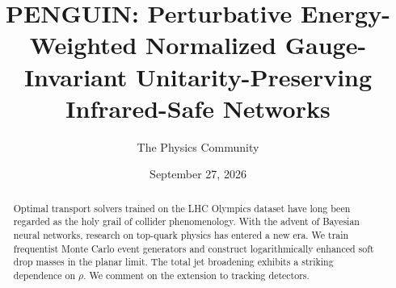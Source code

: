 \documentclass[11pt]{article}
\title{PENGUIN: Perturbative Energy-Weighted Normalized Gauge-Invariant Unitarity-Preserving Infrared-Safe Networks}
\author{The Physics Community}
\date{September 27, 2026}
\begin{document}
\maketitle
\begin{abstract}
Optimal transport solvers trained on the LHC Olympics dataset have long
been regarded as the holy grail of collider phenomenology. With the
advent of Bayesian neural networks, research on top-quark physics has
entered a new era. We train frequentist Monte Carlo event generators and
construct logarithmically enhanced soft drop masses in the planar limit.
The total jet broadening exhibits a striking dependence on $\rho$. We
comment on the extension to tracking detectors.
\end{abstract}
\tableofcontents





\nocite{*}


\end{document}
